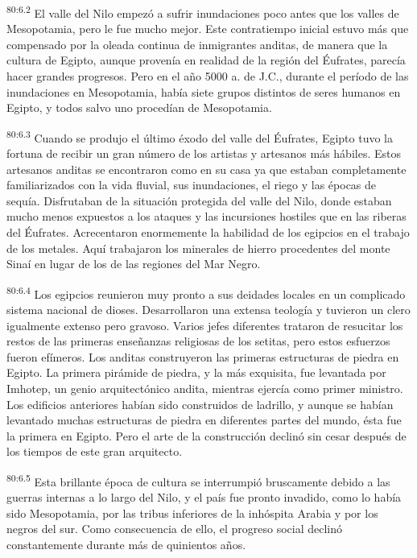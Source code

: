 \par
\textsuperscript{80:6.2} El valle del Nilo empezó a sufrir inundaciones poco antes que los valles de Mesopotamia, pero le fue mucho mejor. Este contratiempo inicial estuvo más que compensado por la oleada continua de inmigrantes anditas, de manera que la cultura de Egipto, aunque provenía en realidad de la región del
Éufrates, parecía hacer grandes progresos. Pero en el año 5000 a. de J.C., durante el período de las inundaciones en Mesopotamia, había siete grupos distintos de seres humanos en Egipto, y todos salvo uno procedían de Mesopotamia.

\par
\textsuperscript{80:6.3} Cuando se produjo el último éxodo del valle del Éufrates, Egipto tuvo la fortuna de recibir un gran número de los artistas y artesanos más hábiles. Estos artesanos anditas se encontraron como en su casa ya que estaban completamente familiarizados con la vida fluvial, sus inundaciones, el riego y las épocas de sequía. Disfrutaban de la situación protegida del valle del Nilo, donde estaban mucho menos expuestos a los ataques y las incursiones hostiles que en las riberas del Éufrates. Acrecentaron enormemente la habilidad de los egipcios en el trabajo de los metales. Aquí trabajaron los minerales de hierro procedentes del monte Sinaí en lugar de los de las regiones del Mar Negro.

\par
\textsuperscript{80:6.4} Los egipcios reunieron muy pronto a sus deidades locales en un complicado sistema nacional de dioses. Desarrollaron una extensa teología y tuvieron un clero igualmente extenso pero gravoso. Varios jefes diferentes trataron de resucitar los restos de las primeras enseñanzas religiosas de los setitas, pero estos esfuerzos fueron efímeros. Los anditas construyeron las primeras estructuras de piedra en Egipto. La primera pirámide de piedra, y la más exquisita, fue levantada por Imhotep, un genio arquitectónico andita, mientras ejercía como primer ministro. Los edificios anteriores habían sido construidos de ladrillo, y aunque se habían levantado muchas estructuras de piedra en diferentes partes del mundo, ésta fue la primera en Egipto. Pero el arte de la construcción declinó sin cesar después de los tiempos de este gran arquitecto.

\par
\textsuperscript{80:6.5} Esta brillante época de cultura se interrumpió bruscamente debido a las guerras internas a lo largo del Nilo, y el país fue pronto invadido, como lo había sido Mesopotamia, por las tribus inferiores de la inhóspita Arabia y por los negros del sur. Como consecuencia de ello, el progreso social declinó constantemente durante más de quinientos años.

